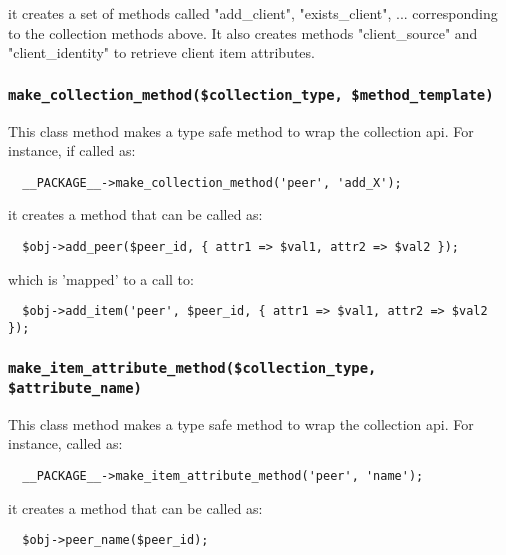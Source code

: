 it creates a set of methods called "add\_client", "exists\_client", ...
corresponding to the collection methods above.  It also creates methods
"client\_source" and "client\_identity" to retrieve client item attributes.

\subsubsection*{\texttt{make\_collection\_method(\$collection\_type, \$method\_template)}\label{xPL::Base_make_collection_method_collection_type_method_template_}}


This class method makes a type safe method to wrap the collection api.
For instance, if called as:

\begin{verbatim}
  __PACKAGE__->make_collection_method('peer', 'add_X');
\end{verbatim}


it creates a method that can be called as:

\begin{verbatim}
  $obj->add_peer($peer_id, { attr1 => $val1, attr2 => $val2 });
\end{verbatim}


which is 'mapped' to a call to:

\begin{verbatim}
  $obj->add_item('peer', $peer_id, { attr1 => $val1, attr2 => $val2 });
\end{verbatim}
\subsubsection*{\texttt{make\_item\_attribute\_method(\$collection\_type, \$attribute\_name)}\label{xPL::Base_make_item_attribute_method_collection_type_attribute_name_}}


This class method makes a type safe method to wrap the collection api.
For instance, called as:

\begin{verbatim}
  __PACKAGE__->make_item_attribute_method('peer', 'name');
\end{verbatim}


it creates a method that can be called as:

\begin{verbatim}
  $obj->peer_name($peer_id);
\end{verbatim}


